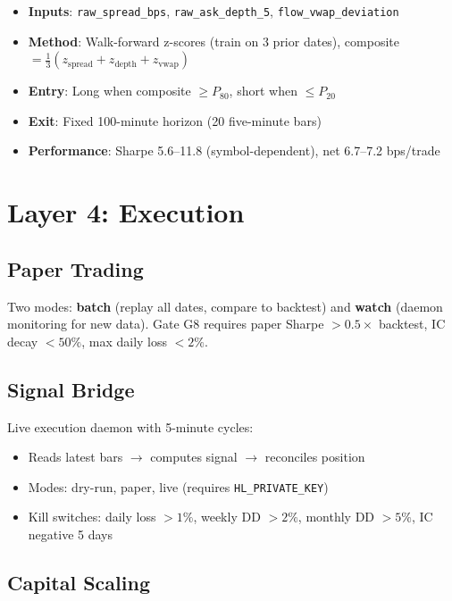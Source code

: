 \documentclass[11pt,a4paper]{article}
\begin{document}
\begin{itemize}
    \item \textbf{Inputs}: \texttt{raw\_spread\_bps}, \texttt{raw\_ask\_depth\_5}, \texttt{flow\_vwap\_deviation}
    \item \textbf{Method}: Walk-forward z-scores (train on 3 prior dates), composite $= \frac{1}{3}(z_{\text{spread}} + z_{\text{depth}} + z_{\text{vwap}})$
    \item \textbf{Entry}: Long when composite $\geq P_{80}$, short when $\leq P_{20}$
    \item \textbf{Exit}: Fixed 100-minute horizon (20 five-minute bars)
    \item \textbf{Performance}: Sharpe 5.6--11.8 (symbol-dependent), net 6.7--7.2 bps/trade
\end{itemize}

\section{Layer 4: Execution}

\subsection{Paper Trading}

Two modes: \textbf{batch} (replay all dates, compare to backtest) and \textbf{watch} (daemon monitoring for new data). Gate G8 requires paper Sharpe $> 0.5\times$ backtest, IC decay $< 50\%$, max daily loss $< 2\%$.

\subsection{Signal Bridge}

Live execution daemon with 5-minute cycles:
\begin{itemize}
    \item Reads latest bars $\to$ computes signal $\to$ reconciles position
    \item Modes: dry-run, paper, live (requires \texttt{HL\_PRIVATE\_KEY})
    \item Kill switches: daily loss $> 1\%$, weekly DD $> 2\%$, monthly DD $> 5\%$, IC negative 5 days
\end{itemize}

\subsection{Capital Scaling}
\end{document}
